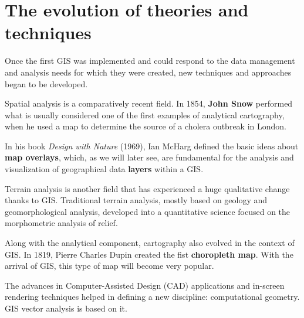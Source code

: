 \section{The evolution of theories and techniques}

Once the first GIS was implemented and could respond to the data management and analysis needs for which they were created, new techniques and approaches began to be developed. 

Spatial analysis is a comparatively recent field. In 1854, \textbf{John Snow} performed what is usually considered one of the first examples of analytical cartography, when he used a map to determine the source of a cholera outbreak in London.

In his book \emph{Design with Nature} (1969), Ian McHarg defined the basic ideas about  \textbf{map overlays}, which, as we will later see, are fundamental for the analysis and visualization of geographical data \textbf{layers} within a GIS.

Terrain analysis is another field that has experienced a huge qualitative change thanks to GIS. Traditional terrain analysis, mostly based on geology and geomorphological analysis, developed into a quantitative science focused on the morphometric analysis of relief.

Along with the analytical component, cartography also evolved in the context of GIS. In 1819, Pierre Charles Dupin created the fist \textbf{choropleth map}. With the arrival of GIS, this type of map will become very popular.

The advances in Computer-Assisted Design (CAD) applications and in-screen rendering techniques helped in defining a new discipline: computational geometry. GIS vector analysis is based on it.

\pagestyle{empty}
